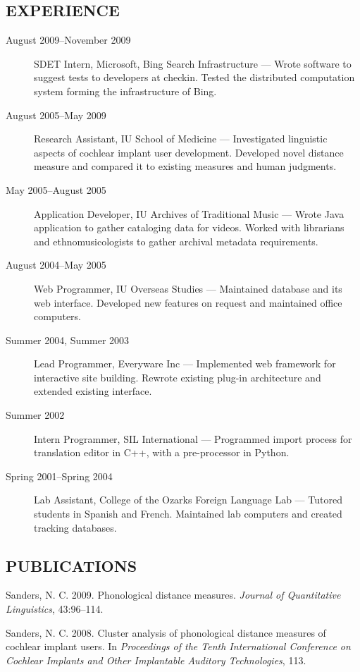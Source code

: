 \documentclass{iuthesis}
\begin{document}
\subsection*{EXPERIENCE}
\begin{description}
\item[August 2009--November 2009]
  SDET Intern, Microsoft, Bing Search Infrastructure --- Wrote
  software to suggest tests to developers at checkin. Tested
  the distributed computation system forming the infrastructure of
  Bing.
\item[August 2005--May 2009]
  Research Assistant, IU School of Medicine --- Investigated linguistic
  aspects of cochlear implant user development. Developed novel distance
  measure and compared it to existing measures and human judgments.
\item[May 2005--August 2005]
  Application Developer, IU Archives of Traditional Music --- Wrote Java
  application to gather cataloging data for videos. Worked with librarians and
  ethnomusicologists to gather archival metadata requirements.
\item[August 2004--May 2005]
  Web Programmer, IU Overseas Studies --- Maintained database and its
  web interface. Developed new features on request and maintained
  office computers.
\item[Summer 2004, Summer 2003]
  Lead Programmer, Everyware Inc --- Implemented web framework
  for interactive site building. Rewrote existing plug-in
  architecture and extended existing interface.
\item[Summer 2002]
  Intern Programmer, SIL International --- Programmed import
  process for translation editor in C++, with a pre-processor in Python.
\item[Spring 2001--Spring 2004]
  Lab Assistant, College of the Ozarks Foreign Language Lab ---
  Tutored students in Spanish and French. Maintained lab
  computers and created tracking databases.
\end{description}
\subsection*{PUBLICATIONS}

\indent\indent Sanders, N. C. 2009. Phonological distance measures. \emph{Journal
    of Quantitative Linguistics}, 43:96--114.

  Sanders, N. C. 2008. Cluster analysis of phonological distance
  measures of cochlear implant users. In \emph{Proceedings of the
    Tenth International Conference on Cochlear Implants and Other
    Implantable Auditory Technologies}, 113.
\end{document}
